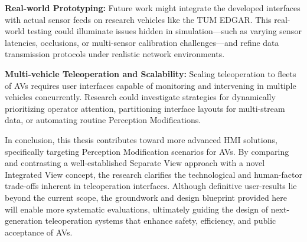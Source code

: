 \textbf{Real-world Prototyping:}
Future work might integrate the developed interfaces with actual sensor feeds on research vehicles like the TUM EDGAR. This real-world testing could illuminate issues hidden in simulation—such as varying sensor latencies, occlusions, or multi-sensor calibration challenges—and refine data transmission protocols under realistic network environments.

\textbf{Multi-vehicle Teleoperation and Scalability:}
Scaling teleoperation to fleets of \acp{AV} requires user interfaces capable of monitoring and intervening in multiple vehicles concurrently. Research could investigate strategies for dynamically prioritizing operator attention, partitioning interface layouts for multi-stream data, or automating routine Perception Modifications.

In conclusion, this thesis contributes toward more advanced \ac{HMI} solutions, specifically targeting Perception Modification scenarios for \acp{AV}. By comparing and contrasting a well-established Separate View approach with a novel Integrated View concept, the research clarifies the technological and human-factor trade-offs inherent in teleoperation interfaces. Although definitive user-results lie beyond the current scope, the groundwork and design blueprint provided here will enable more systematic evaluations, ultimately guiding the design of next-generation teleoperation systems that enhance safety, efficiency, and public acceptance of \acp{AV}.